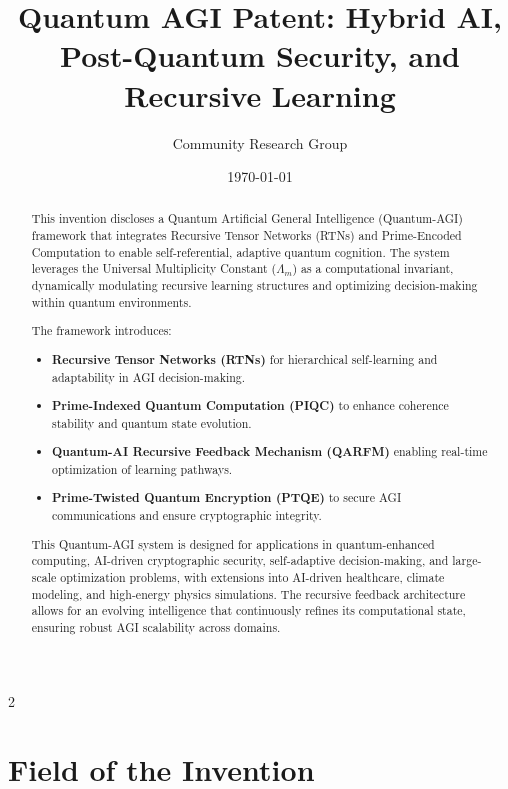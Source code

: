 \documentclass{article}
\title{Quantum AGI Patent: Hybrid AI, Post-Quantum Security, and Recursive Learning}
\author{Community Research Group}
\affil{Citizen Gardens - The Foundation of Multiplicity}
\date{\today}
\theoremstyle{plain}
\begin{document}
\maketitle
\nolinenumbers
\begin{abstract}
This invention discloses a Quantum Artificial General Intelligence (Quantum-AGI) framework that integrates Recursive Tensor Networks (RTNs) and Prime-Encoded Computation to enable self-referential, adaptive quantum cognition. The system leverages the Universal Multiplicity Constant ($\Lambda_m$) as a computational invariant, dynamically modulating recursive learning structures and optimizing decision-making within quantum environments.

The framework introduces:
\begin{itemize}
    \item \textbf{Recursive Tensor Networks (RTNs)} for hierarchical self-learning and adaptability in AGI decision-making.
    \item \textbf{Prime-Indexed Quantum Computation (PIQC)} to enhance coherence stability and quantum state evolution.
    \item \textbf{Quantum-AI Recursive Feedback Mechanism (QARFM)} enabling real-time optimization of learning pathways.
    \item \textbf{Prime-Twisted Quantum Encryption (PTQE)} to secure AGI communications and ensure cryptographic integrity.
\end{itemize}

This Quantum-AGI system is designed for applications in quantum-enhanced computing, AI-driven cryptographic security, self-adaptive decision-making, and large-scale optimization problems, with extensions into AI-driven healthcare, climate modeling, and high-energy physics simulations. The recursive feedback architecture allows for an evolving intelligence that continuously refines its computational state, ensuring robust AGI scalability across domains. 

\end{abstract}

\newpage
 \begin{multicols}{2}
\begin{singlespace}
\tableofcontents
\end{singlespace}
\end{multicols}

\linenumbers
\section{Field of the Invention}
\end{document}
